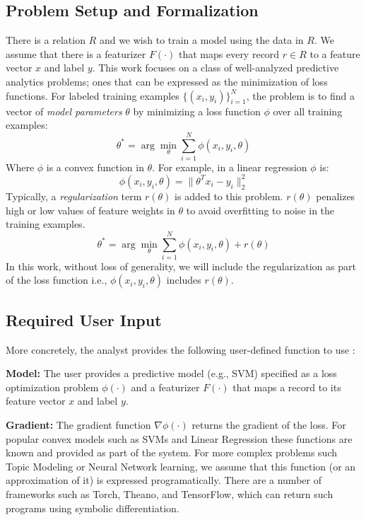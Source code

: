 \subsection{Problem Setup and Formalization}
There is a relation $R$ and we wish to train a model using the data in $R$.
We assume that there is a featurizer $F(\cdot)$ that maps every record $r \in R$ to a feature vector $x$ and label $y$.
This work focuses on a class of well-analyzed predictive analytics problems; ones that can be expressed as the minimization of loss functions.
For labeled training examples $\{(x_{i},y_{i})\}_{i=1}^{N}$, the problem is to find a vector of \emph{model parameters} $\theta$ by minimizing a loss function $\phi$ over all training examples:
\[
 \theta^{*}=\arg\min_{\theta}\sum_{i=1}^{N}\phi(x_{i},y_{i},\theta)
\]
Where $\phi$ is a convex function in $\theta$.
For example, in a linear regression $\phi$ is:
\[
\phi(x_{i},y_{i},\theta) = \|\theta^Tx_{i} - y_i \|_2^2
\]
Typically, a \emph{regularization} term $r(\theta)$ is added to this problem.
$r(\theta)$ penalizes high or low values of feature weights in $\theta$ to avoid overfitting to noise in the training examples.
\begin{equation}
 \theta^{*}=\arg\min_{\theta}\sum_{i=1}^{N}\phi(x_{i},y_{i},\theta) + r(\theta)
 \label{ideal}
\end{equation}
In this work, without loss of generality, we will include the regularization as part of the loss function i.e., $\phi(x_{i},y_{i},\theta)$ includes $r(\theta)$.

\subsection{Required User Input}\label{uinp}
More concretely, the analyst provides the following user-defined function to use \sys:

\noindent\textbf{Model:} The user provides a predictive model (e.g., SVM) specified as a loss optimization problem $\phi(\cdot)$ and a featurizer $F(\cdot)$ that maps a record to its feature vector $x$ and label $y$.

\vspace{0.25em}

\noindent\textbf{Gradient:} The gradient function $\nabla\phi(\cdot)$ returns the gradient of the loss. 
For popular convex models such as SVMs and Linear Regression these functions are known and provided as part of the system. 
For more complex problems such Topic Modeling or Neural Network learning, we assume that this function (or an approximation of it) is expressed programatically. There are a number of frameworks such as Torch, Theano, and TensorFlow, which can return such programs using symbolic differentiation. 

